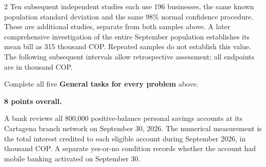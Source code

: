 \begin{multicols}{2}
Ten subsequent independent studies each use 196 businesses, the same known population standard deviation and the same 98\% normal confidence procedure. These are additional studies, separate from both samples above. A later comprehensive investigation of the entire September population establishes its mean bill as 315 thousand COP. Repeated samples do not establish this value. The following subsequent intervals allow retrospective assessment; all endpoints are in thousand COP.

\par\noindent\begin{minipage}{\linewidth}
\begin{minipage}[t]{.49\linewidth}
\end{minipage}\hfill
\begin{minipage}[t]{.49\linewidth}
\end{minipage}
\end{minipage}\par


Complete all five \textbf{General tasks for every problem} above.
\endgroup

\columnbreak

\textbf{8 points overall.}

A bank reviews all 800,000 positive-balance personal savings accounts at its Cartagena branch network on September 30, 2026. The numerical measurement is the total interest credited to each eligible account during September 2026, in thousand COP. A separate yes-or-no condition records whether the account had mobile banking activated on September 30.


\end{multicols}
